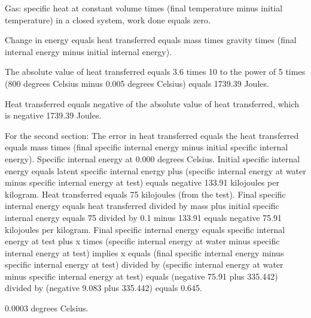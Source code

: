 Gas: specific heat at constant volume times (final temperature minus initial temperature) in a closed system, work done equals zero.

Change in energy equals heat transferred equals mass times gravity times (final internal energy minus initial internal energy).

The absolute value of heat transferred equals 3.6 times 10 to the power of 5 times (800 degrees Celsius minus 0.005 degrees Celsius) equals 1739.39 Joules.

Heat transferred equals negative of the absolute value of heat transferred, which is negative 1739.39 Joules.

For the second section:
The error in heat transferred equals the heat transferred equals mass times (final specific internal energy minus initial specific internal energy).
Specific internal energy at 0.000 degrees Celsius.
Initial specific internal energy equals latent specific internal energy plus (specific internal energy at water minus specific internal energy at test) equals negative 133.91 kilojoules per kilogram.
Heat transferred equals 75 kilojoules (from the test).
Final specific internal energy equals heat transferred divided by mass plus initial specific internal energy equals 75 divided by 0.1 minus 133.91 equals negative 75.91 kilojoules per kilogram.
Final specific internal energy equals specific internal energy at test plus x times (specific internal energy at water minus specific internal energy at test) implies x equals (final specific internal energy minus specific internal energy at test) divided by (specific internal energy at water minus specific internal energy at test) equals (negative 75.91 plus 335.442) divided by (negative 9.083 plus 335.442) equals 0.645.

0.0003 degrees Celsius.
